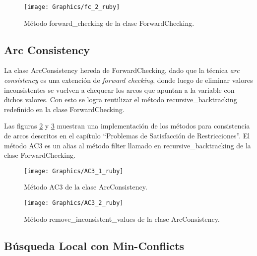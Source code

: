\begin{figure}[h]
	\begin{center}
		\texttt{[image: Graphics/fc\_2\_ruby]}
		\caption{M\'etodo \textsf{forward\_checking} de la clase \textsf{ForwardChecking}.}
		\label{fc_2_ruby}
	\end{center}	
\end{figure}

\subsection{Arc Consistency}

La clase \textsf{ArcConsistency} hereda de \textsf{ForwardChecking}, dado que la t\'ecnica \emph{arc consistency} es una extenci\'on de \emph{forward checking}, donde luego de eliminar valores inconsistentes se vuelven a chequear los arcos que apuntan a la variable con dichos valores. Con esto se logra reutilizar el m\'etodo \textsf{recursive\_backtracking} redefinido en la clase \textsf{ForwardChecking}.

Las figuras \ref{AC3_1_ruby} y \ref{AC3_2_ruby} muestran una implementaci\'on de los m\'etodos para consistencia de arcos descritos en el cap\'itulo ``Problemas de Satisfacci\'on de Restricciones''. El m\'etodo \textsf{AC3} es un alias al m\'etodo \textsf{filter} llamado en \textsf{recursive\_backtracking} de la clase \textsf{ForwardChecking}.

\begin{figure}[h]
	\begin{center}
		\texttt{[image: Graphics/AC3\_1\_ruby]}
		\caption{M\'etodo \textsf{AC3} de la clase \textsf{ArcConsistency}.}
		\label{AC3_1_ruby}
	\end{center}	
\end{figure}

\begin{figure}[h]
	\begin{center}
		\texttt{[image: Graphics/AC3\_2\_ruby]}
		\caption{M\'etodo \textsf{remove\_inconsistent\_values} de la clase \textsf{ArcConsistency}.}
		\label{AC3_2_ruby}
	\end{center}	
\end{figure}

\subsection{B\'usqueda Local con Min-Conflicts}